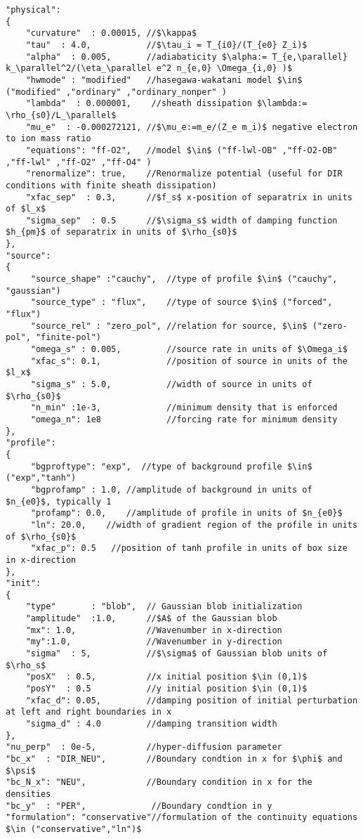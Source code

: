 \begin{verbatim}
"physical":
{
    "curvature"  : 0.00015, //$\kappa$
    "tau"  : 4.0,           //$\tau_i = T_{i0}/(T_{e0} Z_i)$
    "alpha"  : 0.005,       //adiabaticity $\alpha:= T_{e,\parallel} k_\parallel^2/(\eta_\parallel e^2 n_{e,0} \Omega_{i,0} )$
    "hwmode" : "modified"   //hasegawa-wakatani model $\in$ ("modified" ,"ordinary" ,"ordinary_nonper" )
    "lambda"  : 0.000001,    //sheath dissipation $\lambda:= \rho_{s0}/L_\parallel$
    "mu_e"  : -0.000272121, //$\mu_e:=m_e/(Z_e m_i)$ negative electron to ion mass ratio
    "equations": "ff-O2",   //model $\in$ ("ff-lwl-OB" ,"ff-O2-OB" ,"ff-lwl" ,"ff-O2" ,"ff-O4" )
    "renormalize": true,    //Renormalize potential (useful for DIR conditions with finite sheath dissipation)
    "xfac_sep"  : 0.3,      //$f_s$ x-position of separatrix in units of $l_x$     
    "sigma_sep"  : 0.5      //$\sigma_s$ width of damping function $h_{pm}$ of separatrix in units of $\rho_{s0}$    
},
"source":
{
     "source_shape" :"cauchy",  //type of profile $\in$ ("cauchy", "gaussian")
     "source_type" : "flux",    //type of source $\in$ ("forced", "flux")
     "source_rel" : "zero_pol", //relation for source, $\in$ ("zero-pol", "finite-pol")
     "omega_s" : 0.005,         //source rate in units of $\Omega_i$
     "xfac_s": 0.1,             //position of source in units of the $l_x$
     "sigma_s" : 5.0,           //width of source in units of $\rho_{s0}$
     "n_min" :1e-3,             //minimum density that is enforced
     "omega_n": 1e8             //forcing rate for minimum density 
},
"profile":
{
     "bgproftype": "exp",  //type of background profile $\in$ ("exp","tanh")
     "bgprofamp" : 1.0, //amplitude of background in units of $n_{e0}$, typically 1
     "profamp": 0.0,    //amplitude of profile in units of $n_{e0}$
     "ln": 20.0,    //width of gradient region of the profile in units of $\rho_{s0}$
     "xfac_p": 0.5   //position of tanh profile in units of box size in x-direction
},
"init":
{
    "type"       : "blob",  // Gaussian blob initialization
    "amplitude"  :1.0,      //$A$ of the Gaussian blob
    "mx": 1.0,              //Wavenumber in x-direction
    "my":1.0,               //Wavenumber in y-direction
    "sigma"  : 5,           //$\sigma$ of Gaussian blob units of $\rho_s$
    "posX"  : 0.5,          //x initial position $\in (0,1)$
    "posY"  : 0.5           //y initial position $\in (0,1)$
    "xfac_d": 0.05,         //damping position of initial perturbation at left and right boundaries in x
    "sigma_d" : 4.0         //damping transition width
},
"nu_perp"  : 0e-5,          //hyper-diffusion parameter
"bc_x"  : "DIR_NEU",        //Boundary condtion in x for $\phi$ and $\psi$
"bc_N_x": "NEU",            //Boundary condition in x for the densities
"bc_y"  : "PER",             //Boundary condtion in y
"formulation": "conservative"//formulation of the continuity equations $\in ("conservative","ln")$
\end{verbatim}
